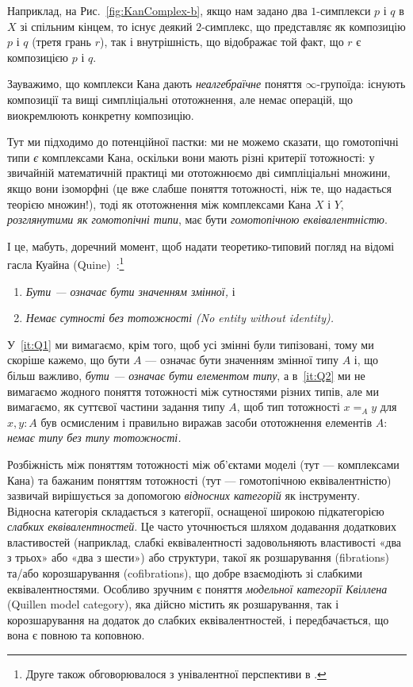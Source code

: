 \documentclass[12pt]{article}
\begin{document}
Наприклад, на Рис.~\ref{fig:KanComplex-b}, якщо нам задано два $1$-симплекси $p$ і $q$ в $X$ зі спільним кінцем, то існує деякий $2$-симплекс, що представляє як композицію $p$ і $q$ (третя грань $r$), так і внутрішність, що відображає той факт, що $r$ є композицією $p$ і $q$.

Зауважимо, що комплекси Кана дають \emph{неалгебраїчне} поняття $\infty$-групоїда: існують композиції та вищі симпліціальні ототожнення, але немає операцій, що виокремлюють конкретну композицію.

Тут ми підходимо до потенційної пастки: ми не можемо сказати, що гомотопічні типи \emph{є} комплексами Кана, оскільки вони мають різні критерії тотожності: у звичайній математичній практиці ми ототожнюємо дві симпліціальні множини, якщо вони ізоморфні (це вже слабше поняття тотожності, ніж те, що надається теорією множин!), тоді як ототожнення між комплексами Кана $X$ і $Y$, \emph{розглянутими як гомотопічні типи}, має бути \emph{гомотопічною еквівалентністю}. 

І це, мабуть, доречний момент, щоб надати теоретико-типовий погляд на відомі гасла Куайна (Quine)~\cite{Quine1969}:\footnote{Друге також обговорювалося з унівалентної перспективи в \cite{Rodin2017,Tsementzis2017}.}
\begin{enumerate}
\item\label{it:Q1} \emph{Бути — означає бути значенням змінної,} і
\item\label{it:Q2} \emph{Немає сутності без тотожності (No entity without identity).}
\end{enumerate}
У~\ref{it:Q1} ми вимагаємо, крім того, щоб усі змінні були типізовані, тому ми скоріше кажемо, що бути $A$ — означає бути значенням змінної типу $A$ і, що більш важливо, \emph{бути — означає бути елементом типу}, а в~\ref{it:Q2} ми не вимагаємо жодного поняття тотожності між сутностями різних типів, але ми вимагаємо, як суттєвої частини задання типу $A$, щоб тип тотожності $x=_Ay$ для $x,y:A$ був осмисленим і правильно виражав засоби ототожнення елементів $A$: \emph{немає типу без типу тотожності.}

Розбіжність між поняттям тотожності між об'єктами моделі (тут — комплексами Кана) та бажаним поняттям тотожності (тут — гомотопічною еквівалентністю) зазвичай вирішується за допомогою \emph{відносних категорій} як інструменту. Відносна категорія складається з категорії, оснащеної широкою підкатегорією \emph{слабких еквівалентностей}. Це часто уточнюється шляхом додавання додаткових властивостей (наприклад, слабкі еквівалентності задовольняють властивості «два з трьох» або «два з шести») або структури, такої як розшарування (fibrations) та/або корозшарування (cofibrations), що добре взаємодіють зі слабкими еквівалентностями. Особливо зручним є поняття \emph{модельної категорії Квіллена} (Quillen model category), яка дійсно містить як розшарування, так і корозшарування на додаток до слабких еквівалентностей, і передбачається, що вона є повною та коповною.
\end{document}
